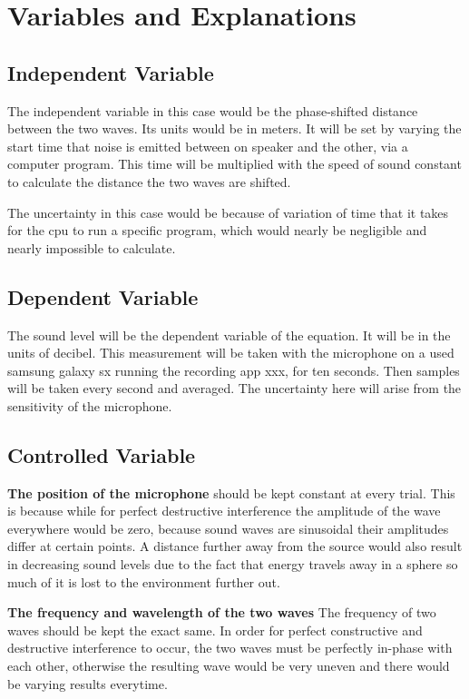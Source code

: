 \documentclass[index]{subfiles}
\begin{document}
\section{Variables and Explanations}

\subsection{Independent Variable}

The independent variable in this case would be the phase-shifted distance between the two waves. Its units would be in meters. It will be set by varying the start time that noise is emitted between on speaker and the other, via a computer program. This time will be multiplied with the speed of sound constant to calculate the distance the two waves are shifted.

The uncertainty in this case would be because of variation of time that it takes for the cpu to run a specific program, which would nearly be negligible and nearly impossible to calculate.

\subsection{Dependent Variable}

The sound level will be the dependent variable of the equation. It will be in the units of decibel. This measurement will be taken with the microphone on a used samsung galaxy sx running the recording app xxx, for ten seconds. Then samples will be taken every second and averaged. The uncertainty here will arise from the sensitivity of the microphone.

\subsection{Controlled Variable}

\textbf{The position of the microphone} should be kept constant at every trial. This is because while for perfect destructive interference the amplitude of the wave everywhere would be zero, because sound waves are sinusoidal their amplitudes differ at certain points. A distance further away from the source would also result in decreasing sound levels due to the fact that energy travels away in a sphere so much of it is lost to the environment further out.

\textbf{The frequency and wavelength of the two waves} The frequency of two waves should be kept the exact same. In order for perfect constructive and destructive interference to occur, the two waves must be perfectly in-phase with each other, otherwise the resulting wave would be very uneven and there would be varying results everytime.
\end{document}
